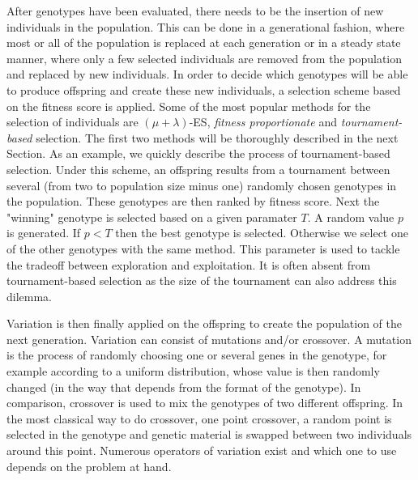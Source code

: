 
    After genotypes have been evaluated, there needs to be the insertion of new individuals in the population. This can be done in a generational fashion, where most or all of the population is replaced at each generation or in a steady state manner, where only a few selected individuals are removed from the population and replaced by new individuals. In order to decide which genotypes will be able to produce offspring and create these new individuals, a selection scheme based on the fitness score is applied. Some of the most popular methods for the selection of individuals are \((\mu + \lambda)\)-ES, \emph{fitness proportionate} and \emph{tournament-based} selection. The first two methods will be thoroughly described in the next Section. As an example, we quickly describe the process of tournament-based selection. Under this scheme, an offspring results from a tournament between several (from two to population size minus one) randomly chosen genotypes in the population. These genotypes are then ranked by fitness score. Next the "winning" genotype is selected based on a given paramater $T$. A random value $p$ is generated. If \(p < T\) then the best genotype is selected. Otherwise we select one of the other genotypes with the same method. This parameter is used to tackle the tradeoff between exploration and exploitation. It is often absent from tournament-based selection as the size of the tournament can also address this dilemma.

    Variation is then finally applied on the offspring to create the population of the next generation. Variation can consist of mutations and/or crossover. A mutation is the process of randomly choosing one or several genes in the genotype, for example according to a uniform distribution, whose value is then randomly changed (in the way that depends from the format of the genotype). In comparison, crossover is used to mix the genotypes of two different offspring. In the most classical way to do crossover, one point crossover, a random point is selected in the genotype and genetic material is swapped between two individuals around this point. Numerous operators of variation exist and which one to use depends on the problem at hand.

